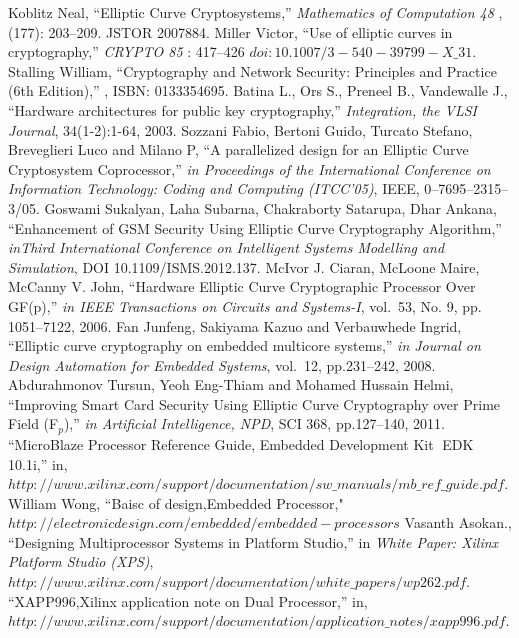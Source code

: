 \documentclass[preprint,12pt]{elsarticle}
\begin{document}
\begin{thebibliography}{00}
{Koblitz Neal}, ``{Elliptic Curve Cryptosystems},'' \emph{Mathematics of Computation 48 }, (177): 203--209. JSTOR 2007884.
{Miller Victor}, ``{Use of elliptic curves in cryptography},'' \emph{CRYPTO 85 }: 417--426 $ doi:10.1007/3-540-39799-X\_31$.
{Stalling William}, ``{Cryptography and Network Security: Principles and Practice (6th Edition)},'' , ISBN: 0133354695.
{Batina L., Ors S., Preneel B., Vandewalle J.}, ``{Hardware architectures for public key cryptography},'' \emph{Integration, the VLSI Journal}, 34(1-2):1-64, 2003.
{Sozzani Fabio, Bertoni Guido, Turcato Stefano, Breveglieri Luco and Milano P}, ``{A parallelized design for an Elliptic Curve Cryptosystem Coprocessor},'' \emph{in Proceedings of the International Conference on Information Technology: Coding and Computing (ITCC’05)}, IEEE, 0--7695--2315--3/05.
{Goswami Sukalyan, Laha Subarna, Chakraborty Satarupa, Dhar Ankana}, ``{Enhancement of GSM Security Using Elliptic Curve Cryptography Algorithm},'' \emph{inThird International Conference on Intelligent Systems Modelling and Simulation}, DOI 10.1109/ISMS.2012.137.
{McIvor J. Ciaran, McLoone Maire, McCanny V. John}, ``{Hardware Elliptic Curve Cryptographic Processor Over GF(p)},'' \emph{in IEEE Transactions on Circuits and Systems-I}, vol.~53, No. 9,  pp. 1051--7122, 2006.
{Fan Junfeng, Sakiyama Kazuo and Verbauwhede Ingrid}, ``{Elliptic curve cryptography on embedded multicore systems},'' \emph{in Journal
on Design Automation for Embedded Systems}, vol.~12, pp.231--242, 2008.
{Abdurahmonov Tursun, Yeoh Eng-Thiam and Mohamed Hussain Helmi}, ``{Improving Smart Card Security Using Elliptic
Curve Cryptography over Prime Field (F$_p$)},'' \emph{in Artificial Intelligence, NPD}, SCI 368, pp.127--140, 2011.
``{MicroBlaze Processor Reference Guide,
 Embedded Development Kit EDK 10.1i},'' in, $ http://www.xilinx.com/support/documentation/sw\_manuals/mb\_ref\_guide.pdf$.
{William Wong}, ``{Baisc of design,Embedded Processor},"
$http://electronicdesign.com/embedded/embedded-processors$
{Vasanth Asokan.}, ``{Designing Multiprocessor
Systems in Platform Studio},'' in \emph{White Paper: Xilinx Platform Studio (XPS)}, $ http://www.xilinx.com/support/documentation/white\_papers/wp262.pdf$.
``{XAPP996,Xilinx application note on 
Dual Processor},'' in, $ http://www.xilinx.com/support/documentation/application\_notes/xapp996.pdf$.

\end{thebibliography}
\end{document}
